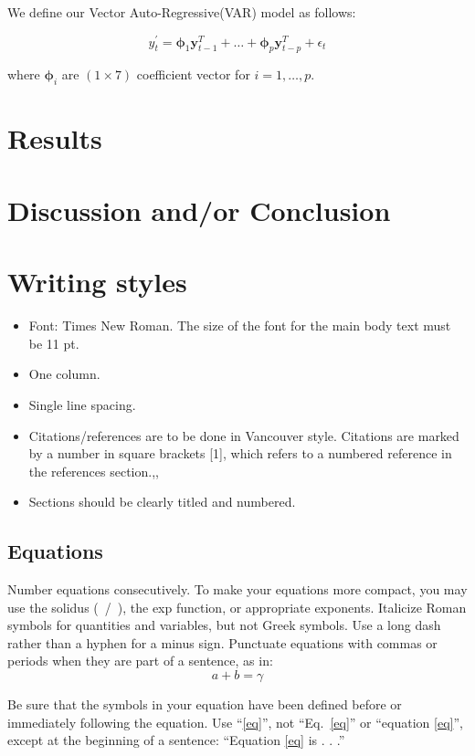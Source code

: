\documentclass[conference,onecolumn,11pt]{IEEEtran}
\begin{document}
We define our Vector Auto-Regressive(VAR) model as follows:

\[
y^{'}_t = \boldsymbol{\phi}_1\mathbf{y}_{t-1}^T+\ldots+\boldsymbol{\phi}_p\mathbf{y}_{t-p}^T+\epsilon_t
\]

where $\boldsymbol{\phi}_i$ are $(1\times7)$ coefficient vector for $i=1,\ldots,p$.




\section{Results}
\section{Discussion and/or Conclusion}

\section{Writing styles}

\begin{itemize}
\item Font: Times New Roman. The size of the font for the main body text must be 11 pt. 
\item One column. 
\item Single line spacing. 
\item Citations/references are to be done in Vancouver style. Citations are marked by a number in square brackets [1], which refers to a numbered reference in the references section.\cite{Xu2018},\cite{Khanderwal2021},\cite{Vijh2020}
\item Sections should be clearly titled and numbered. 
\end{itemize}

\subsection{Equations}
Number equations consecutively. To make your 
equations more compact, you may use the solidus (~/~), the exp function, or 
appropriate exponents. Italicize Roman symbols for quantities and variables, 
but not Greek symbols. Use a long dash rather than a hyphen for a minus 
sign. Punctuate equations with commas or periods when they are part of a 
sentence, as in:
\begin{equation}
a+b=\gamma\label{eq}
\end{equation}

Be sure that the 
symbols in your equation have been defined before or immediately following 
the equation. Use ``\eqref{eq}'', not ``Eq.~\eqref{eq}'' or ``equation \eqref{eq}'', except at 
the beginning of a sentence: ``Equation \eqref{eq} is . . .''

\printbibliography

\vspace{12pt}
\end{document}
